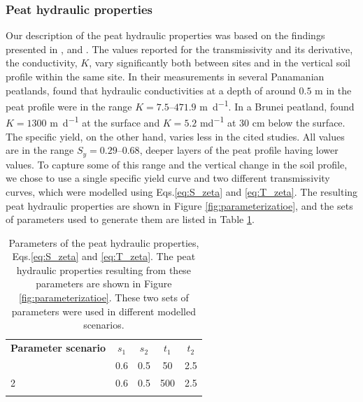 \documentclass[bg, manuscript]{copernicus}
\begin{document}
\subsubsection{Peat hydraulic properties}
Our description of the peat hydraulic properties was based on the findings presented in \cite{cobbHowTemporalPatterns2017}, \cite{hooijerHydrologyTropicalWetland2005} and \cite{bairdHighPermeabilityExplains2017}.
The values reported for the transmissivity and its derivative, the conductivity, $K$, vary significantly both between sites and in the vertical soil profile within the same site.
In their measurements in several Panamanian peatlands, \cite{bairdHighPermeabilityExplains2017} found  that hydraulic conductivities at a depth of around $0.5$ \unit{m} in the peat profile were in the range $K = 7.5 \text{--} 471.9$ \unit{m d^{-1}}.
In a Brunei peatland, \cite{cobbHowTemporalPatterns2017} found $K = 1300$ \unit{m d^{-1}} at the surface and $K = 5.2$ \unit{md^{-1}} at $30$ \unit{cm} below the surface.
The specific yield, on the other hand, varies less in the cited studies.
All values are in the range $S_y=0.29 \text{--} 0.68$, deeper layers of the peat profile having lower values.
To capture some of this range and the vertical change in the soil profile, we chose to use a single specific yield curve and  two different transmissivity curves, which were modelled using Eqs.\eqref{eq:S_zeta} and \eqref{eq:T_zeta}.
The resulting peat hydraulic properties are shown in Figure \ref{fig:parameterizatioe}, and the sets of parameters used to generate them are listed in Table \ref{tab:peat_property_params}.

\begin{table}[t]
\caption{Parameters of the peat hydraulic properties, Eqs.\eqref{eq:S_zeta} and \eqref{eq:T_zeta}. The peat hydraulic properties resulting from these parameters are shown in Figure \ref{fig:parameterizatioe}. These two sets of parameters were used in different modelled scenarios.}
\label{tab:peat_property_params} 
\begin{tabular}{lcccc}
\tophline
\textbf{Parameter scenario} & \textbf{$s_1$} & \textbf{$s_2$} &	\textbf{$t_1$} & \textbf{$t_2$}  \\
\middlehline
1 & 0.6 & 0.5 & 50 & 2.5 \\
2 & 0.6 & 0.5 & 500 & 2.5 \\
\bottomhline
\end{tabular}
\end{table}
\end{document}
